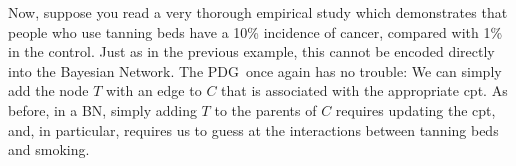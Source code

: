 \documentclass{article}
\newcommand{\MN}{PDG}
\numberwithin{equation}{section}
\begin{document}
\begin{example}
		Now, suppose you read a very thorough empirical study
                which demonstrates that people who use tanning beds
                have a 10\% incidence of cancer, compared with 1\% in
                the control. Just as in the previous example, this
                cannot be encoded directly into the Bayesian Network.  
		The \MN\, once again has no trouble:
We can simply add the node $T$ with an edge to $C$ that is associated with the
appropriate cpt.
%			
	        As before, in a BN, simply adding $T$ to the parents
                of $C$ requires updating the cpt, and, in particular,
                requires us to guess at the interactions between
                tanning beds and smoking. 
	\end{example}	
\end{document}
